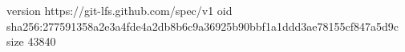 version https://git-lfs.github.com/spec/v1
oid sha256:277591358a2e3a4fde4a2db8b6c9a36925b90bbf1a1ddd3ae78155cf847a5d9c
size 43840
